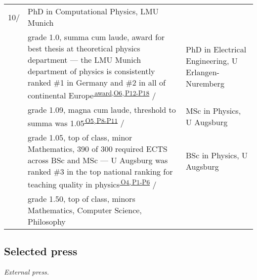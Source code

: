 \begin{longtable}[t]{R{\widthC} p{\widthB}}
10/
&PhD in Computational Physics, LMU Munich\\ 
&{\footnotesize grade 1.0, summa cum laude, award for best thesis at theoretical physics department --- the LMU Munich department of physics is consistently ranked \#1 in Germany and \#2 in all of continental Europe\textsuperscript{\hyperlink{phdprize}{\,award,}}\textsuperscript{\hyperlink{O6}{O6,\,}\hyperlink{P12}{P12-}\hyperlink{P18}{P18}}}
/
&PhD in Electrical Engineering, U Erlangen-Nuremberg\\ 
&{\footnotesize grade 1.09, magna cum laude, threshold to summa was 1.05\textsuperscript{\hyperlink{O5}{\,O5,\,}\hyperlink{P8}{P8-}\hyperlink{P11}{P11}}}
/
& MSc in Physics, U Augsburg\\ 
&{\footnotesize grade 1.05, top of class,  
minor Mathematics, 390 of 300 required ECTS across BSc and MSc --- U Augsburg was ranked \#3 in the top national ranking for teaching quality in physics\textsuperscript{\hyperlink{O4}{\,O4,\,}\hyperlink{P1}{P1-}\hyperlink{P6}{P6}}}%
/ 
& BSc in Physics, U Augsburg\\
&{\footnotesize grade 1.50, top of class,
minors Mathematics, Computer Science, Philosophy}
\end{longtable}

\subsection*{Selected press }

\noindent \textit{External press.}

